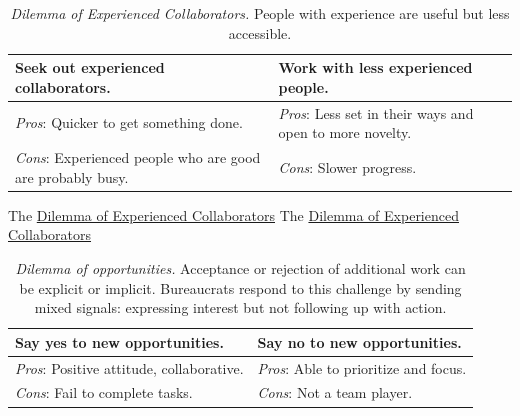 \begin{center}
\begin{table}[H] %
\begin{tabular}{ | m{\dilemmatablewidth}| m{\dilemmatablewidth} | } 
  \hline
  \textbf{Seek out experienced collaborators.} & 
  \textbf{Work with less experienced people.} \\ 
  \hline
  \textit{Pros}: Quicker to get something done. &
  \textit{Pros}: Less set in their ways and open to more novelty. \\  
  \hline
  \textit{Cons}: Experienced people who are good are probably busy. &
  \textit{Cons}: Slower progress. \\  
  \hline
\end{tabular}
\caption{
\textit{Dilemma of Experienced Collaborators.}
People with experience are useful but less accessible.
}
\label{table:experience}
\end{table}
\end{center}


The \href{table:experience}{Dilemma of Experienced Collaborators}
The \href{table:experience}{Dilemma of Experienced Collaborators}


\begin{center}
\begin{table}[H] %
\begin{tabular}{ | m{\dilemmatablewidth}| m{\dilemmatablewidth} | } 
  \hline
  \textbf{Say yes to new opportunities.} & 
  \textbf{Say no to new opportunities.} \\ 
  \hline
  \textit{Pros}: Positive attitude, collaborative. &
  \textit{Pros}: Able to prioritize and focus. \\
  \hline
  \textit{Cons}: Fail to complete tasks. &
  \textit{Cons}: Not a team player. \\  
  \hline
\end{tabular}
\caption{
\textit{Dilemma of opportunities.}
Acceptance or rejection of additional work can be explicit or implicit. Bureaucrats respond to this challenge by sending mixed signals: expressing interest but not following up with action.
}
\label{table:new-opportunties}
\end{table}
\end{center}

